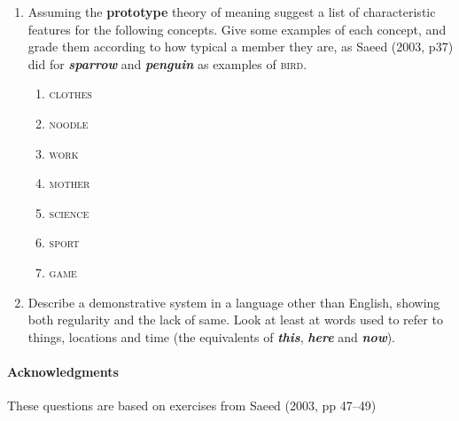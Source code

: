 \documentclass[a4paper]{article}
\newcommand{\lex}[1]{\textbf{\textit{#1}}}
\newcommand{\con}[1]{\textsc{#1}}
\newcommand{\txx}[1]{\textbf{#1}}
\begin{document}
\begin{enumerate}
\item Assuming the \txx{prototype} theory of meaning suggest a list of
  characteristic features for the following concepts.  Give some
  examples of each concept, and grade them according to how typical a
  member they are, as Saeed (2003, p37) did for \lex{sparrow} and
  \lex{penguin} as examples of \con{bird}.
  \begin{enumerate}
  \item \con{clothes}
  \item \con{noodle}
  \item \con{work}
  \item \con{mother}
  \item \con{science}
  \item \con{sport}
  \item \con{game}
  \end{enumerate}

\item Describe a demonstrative system in a language other than
  English, showing both regularity and the lack of same.  Look at
  least at words used to refer to things, locations and time
  (the equivalents of \lex{this}, \lex{here} and \lex{now}).
  
\end{enumerate}

\vfill
\paragraph{Acknowledgments} These questions are based on exercises from 
 Saeed (2003, pp 47--49)
\end{document}
